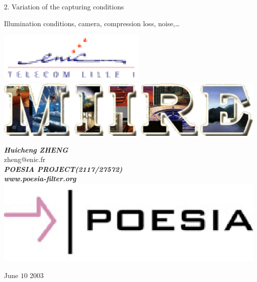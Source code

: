 \documentclass[landscape]{slides}
\def\eniclogo{\includegraphics[height=2EM]{enic.eps}}
\def\miirelogo{\includegraphics[height=1EM]{logomiire.eps}}
\def\poesialogo{\includegraphics[height=1.5EM]{poesiaicon.eps}}
\begin{document}
2. Variation of the capturing conditions

Illumination conditions, camera, compression loss, noise,\ldots

 \hfill
{} \hfill
{} \hfill
{} 

 \hfill
{} \hfill
{} \hfill
{}


\begin{center}

\eniclogo \hspace{2em} \miirelogo 

{\bf \em Huicheng ZHENG} \\
zheng@enic.fr \\[0.5em]

{\bf \em POESIA PROJECT(2117/27572)} \\
{\bf \em www.poesia-filter.org} \\
\poesialogo

June $10$ 2003

\end{center}
\end{document}
